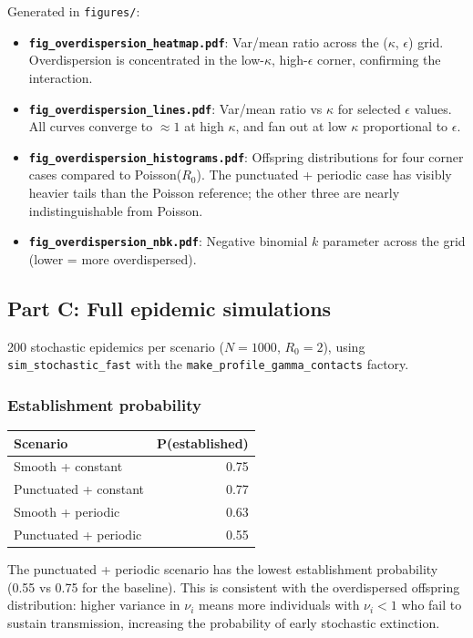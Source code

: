 \documentclass[11pt]{article}
\begin{document}
Generated in \texttt{figures/}:

\begin{itemize}
\item \textbf{\texttt{fig\_overdispersion\_heatmap.pdf}}: Var/mean ratio across the ($\kappa$, $\epsilon$) grid. Overdispersion is concentrated in the low-$\kappa$, high-$\epsilon$ corner, confirming the interaction.
\item \textbf{\texttt{fig\_overdispersion\_lines.pdf}}: Var/mean ratio vs $\kappa$ for selected $\epsilon$ values. All curves converge to $\approx 1$ at high $\kappa$, and fan out at low $\kappa$ proportional to $\epsilon$.
\item \textbf{\texttt{fig\_overdispersion\_histograms.pdf}}: Offspring distributions for four corner cases compared to Poisson($R_0$). The punctuated + periodic case has visibly heavier tails than the Poisson reference; the other three are nearly indistinguishable from Poisson.
\item \textbf{\texttt{fig\_overdispersion\_nbk.pdf}}: Negative binomial $k$ parameter across the grid (lower = more overdispersed).
\end{itemize}

\subsection{Part C: Full epidemic simulations}

200 stochastic epidemics per scenario ($N = 1000$, $R_0 = 2$), using \texttt{sim\_stochastic\_fast} with the \texttt{make\_profile\_gamma\_contacts} factory.

\subsubsection{Establishment probability}

\medskip
\begin{tabular}{lr}
\toprule
Scenario & P(established) \\
\midrule
Smooth + constant     & 0.75 \\
Punctuated + constant & 0.77 \\
Smooth + periodic     & 0.63 \\
Punctuated + periodic & 0.55 \\
\bottomrule
\end{tabular}
\medskip

The punctuated + periodic scenario has the lowest establishment probability (0.55 vs 0.75 for the baseline). This is consistent with the overdispersed offspring distribution: higher variance in $\nu_i$ means more individuals with $\nu_i < 1$ who fail to sustain transmission, increasing the probability of early stochastic extinction.
\end{document}
